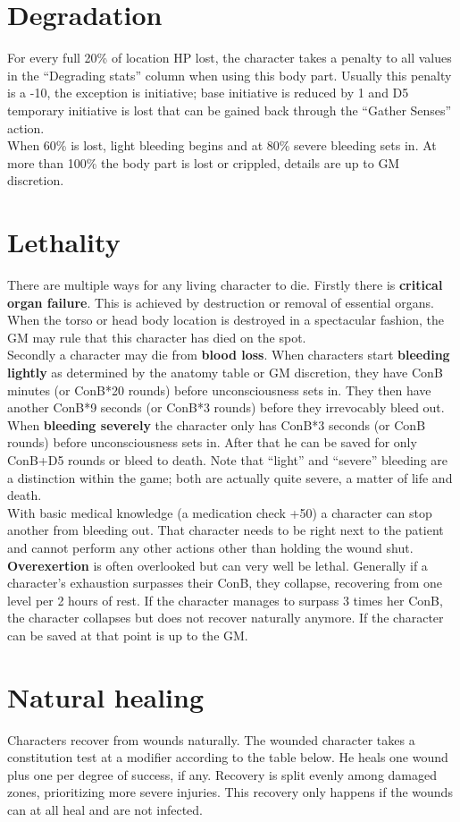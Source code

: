 \documentclass[12pt,a4paper]{book}
\begin{document}
	\section{Degradation}
	For every full 20\% of location HP lost, the character takes a penalty to all values in the “Degrading stats” column when using this body part. Usually this penalty is a -10, the exception is initiative; base initiative is reduced by 1 and D5 temporary initiative is lost that can be gained back through the “Gather Senses” action.\\
	When 60\% is lost, light bleeding begins and at 80\% severe bleeding sets in. At more than 100\% the body part is lost or crippled, details are up to GM discretion.
	\section{Lethality}
	There are multiple ways for any living character to die. 
	Firstly there is \textbf{critical organ failure}. This is achieved by destruction or removal of essential organs. When the torso or head body location is destroyed in a spectacular fashion, the GM may rule that this character has died on the spot.\\
	Secondly a character may die from \textbf{blood loss}. When characters start \textbf{bleeding lightly} as determined by the anatomy table or GM discretion, they have ConB minutes (or ConB*20 rounds) before unconsciousness sets in. They then have another ConB*9 seconds (or ConB*3 rounds) before they irrevocably bleed out. When \textbf{bleeding severely} the character only has ConB*3 seconds (or ConB rounds) before unconsciousness sets in. After that he can be saved for only ConB+D5 rounds or bleed to death. Note that “light” and “severe” bleeding are a distinction within the game; both are actually quite severe, a matter of life and death.\\
	With basic medical knowledge (a medication check +50) a character can stop another from bleeding out. That character needs to be right next to the patient and cannot perform any other actions other than holding the wound shut.\\
	\textbf{Overexertion} is often overlooked but can very well be lethal. Generally if a character’s exhaustion surpasses their ConB, they collapse, recovering from one level per 2 hours of rest. If the character manages to surpass 3 times her ConB, the character collapses but does not recover naturally anymore. If the character can be saved at that point is up to the GM.
	\section{Natural healing}
	Characters recover from wounds naturally. The wounded character takes a constitution test at a modifier according to the table below. He heals one wound plus one per degree of success, if any. Recovery is split evenly among damaged zones, prioritizing more severe injuries. This recovery only happens if the wounds can at all heal and are not infected.
\end{document}

